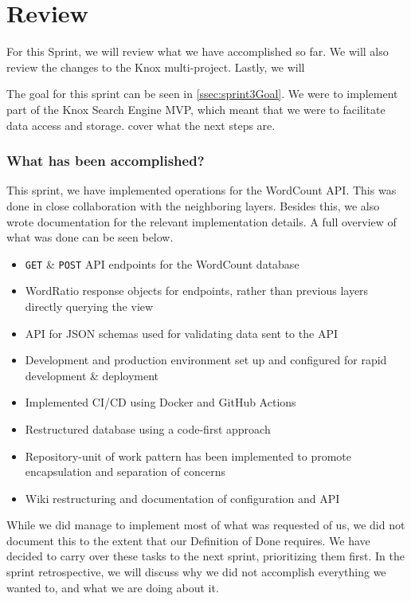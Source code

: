 \section{Review}
For this Sprint, we will review what we have accomplished so far. We will also review the changes to the Knox multi-project. Lastly, we will

The goal for this sprint can be seen in \ref{ssec:sprint3Goal}. We were to implement part of the Knox Search Engine MVP, which meant that we were to facilitate data access and storage.
cover what the next steps are.

\subsubsection{What has been accomplished?}
This sprint, we have implemented operations for the WordCount API. This was done in close collaboration with the neighboring layers. Besides this, we also wrote documentation for the relevant implementation details. A full overview of what was done can be seen below.

\begin{itemize}
    \item \texttt{GET} \& \texttt{POST} API endpoints for the WordCount database
    \item WordRatio response objects for endpoints, rather than previous layers directly querying the view
    \item API for JSON schemas used for validating data sent to the API
    \item Development and production environment set up and configured for rapid development \& deployment
    \item Implemented CI/CD using Docker and GitHub Actions
    \item Restructured database using a code-first approach
    \item Repository-unit of work pattern has been implemented to promote encapsulation and separation of concerns
    \item Wiki restructuring and documentation of configuration and API
\end{itemize}

While we did manage to implement most of what was requested of us, we did not document this to the extent that our Definition of Done requires. We have decided to carry over these tasks to the next sprint, prioritizing them first. In the sprint retrospective, we will discuss why we did not accomplish everything we wanted to, and what we are doing about it.

